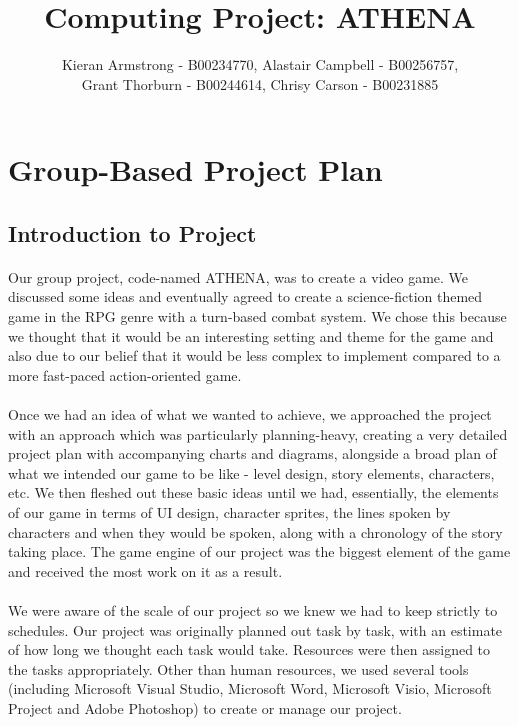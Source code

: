 \documentclass{article}
\title{Computing Project: ATHENA}
\author{Kieran Armstrong - B00234770, Alastair Campbell - B00256757,\\ Grant Thorburn - B00244614, Chrisy Carson - B00231885}
\begin{document}
\begin{titlepage}
\maketitle
\end{titlepage}

\tableofcontents

\pagebreak{}

\section {Group-Based Project Plan}
\subsection{Introduction to Project}
\paragraph{}
Our group project, code-named ATHENA, was to create a video game. We discussed some ideas and eventually agreed to create a science-fiction themed game in the RPG genre with a turn-based combat system. We chose this because we thought that it would be an interesting setting and theme for the game and also due to our belief that it would be less complex to implement compared to a more fast-paced action-oriented game. 
\paragraph{}
Once we had an idea of what we wanted to achieve, we approached the project with an approach which was particularly planning-heavy, creating a very detailed project plan with accompanying charts and diagrams, alongside a broad plan of what we intended our game to be like - level design, story elements, characters, etc. We then fleshed out these basic ideas until we had, essentially, the elements of our game in terms of UI design, character sprites, the lines spoken by characters and when they would be spoken, along with a chronology of the story taking place. The game engine of our project was the biggest element of the game and received the most work on it as a result. 
\paragraph{}
We were aware of the scale of our project so we knew we had to keep strictly to schedules. Our project was originally planned out task by task, with an estimate of how long we thought each task would take. Resources were then assigned to the tasks appropriately. Other than human resources, we used several tools (including Microsoft Visual Studio, Microsoft Word, Microsoft Visio, Microsoft Project and Adobe Photoshop) to create or manage our project.
\end{document}
